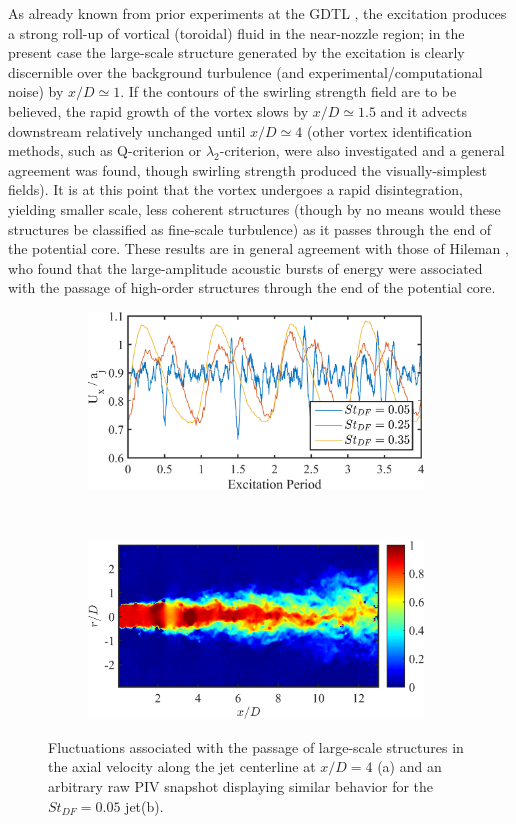 As already known from prior experiments at the GDTL \citep{Kearney-Fischer2009}, the excitation produces a strong roll-up of vortical (toroidal) fluid in the near-nozzle region; in the present case the large-scale structure generated by the excitation is clearly discernible over the background turbulence (and experimental/computational noise) by $x/D \simeq 1$.
If the contours of the swirling strength field are to be believed, the rapid growth of the vortex slows by $x/D \simeq 1.5$ and it advects downstream relatively unchanged until  $x/D \simeq 4$ (other vortex identification methods, such as Q-criterion or $\lambda_2$-criterion, were also investigated and a general agreement was found, though swirling strength produced the visually-simplest fields).
It is at this point that the vortex undergoes a rapid disintegration, yielding smaller scale, less coherent structures (though by no means would these structures be classified as fine-scale turbulence) as it passes through the end of the potential core.
These results are in general agreement with those of Hileman \etal \citep{Hileman2005}, who found that the large-amplitude acoustic bursts of energy were associated with the passage of high-order structures through the end of the potential core.
\begin{figure}
	\centering
	\begin{subfigure}{1\textwidth}
		\centering
		\includegraphics[width=3.5in]{Figures/ch4_centerline_mach_temporal.png}
		\caption{}
		\label{fig:ch4_centerlinemach_temporal}
	\end{subfigure}\\
	\begin{subfigure}{1\textwidth}
		\centering
		\includegraphics[width=3.5in]{Figures/ch4_rawUx_acceleration.png}
		\caption{}
		\label{fig:ch4_St005_rawUx_snapshot}
	\end{subfigure}
	\caption{Fluctuations associated with the passage of large-scale structures in the axial velocity along the jet centerline at $x/D = 4$ (a) and an arbitrary raw PIV snapshot displaying similar behavior for the $St_{DF}  = 0.05$ jet(b).}
\end{figure}

